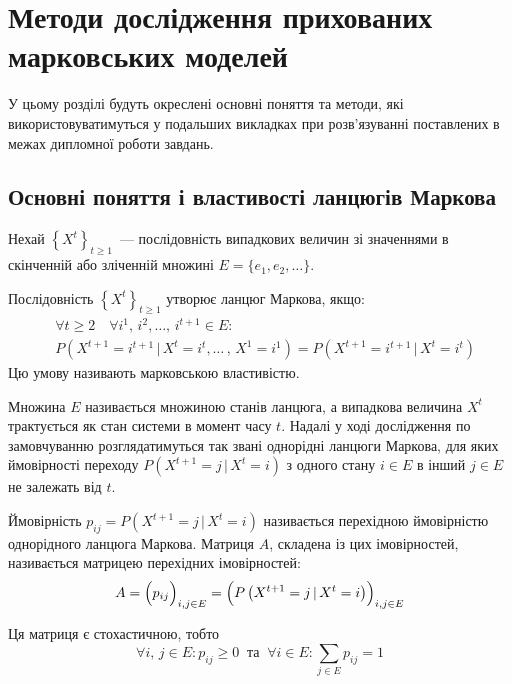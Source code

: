 
\chapter{Методи дослідження прихованих марковських моделей}
\label{chap: review}

У цьому розділі будуть окреслені основні поняття та методи, які використовуватимуться у подальших викладках при розв'язуванні поставлених в межах дипломної роботи завдань.

\section{Основні поняття і властивості ланцюгів Маркова}

Нехай $\left\{ X^t \right\}_{t\geqslant 1}$~--- послідовність випадкових величин зі значеннями в скінченній або зліченній множині $E=\{ e_1,e_2,\ldots \}$. 

\begin{definition}\label{def: markovian property}
    Послідовність $\left\{ X^t \right\}_{t\geqslant 1}$ утворює ланцюг Маркова, якщо:
    \begin{align*}
        & \forall t\geqslant 2 \quad \forall i^1,\,i^2,\ldots,\,i^{t+1} \in E: \\
	    & P\left( X^{t+1}=i^{t+1} \, |\, X^t=i^t,\ldots\,,\, X^1=i^1 \right)=P\left( X^{t+1}=i^{t+1} \, |\, X^t=i^t \right)
    \end{align*}
    Цю умову називають марковською властивістю.
\end{definition}

Множина $E$ називається множиною станів ланцюга, а випадкова величина $X^t$ трактується як стан системи в момент часу $t$. Надалі у ході дослідження по замовчуванню розглядатимуться так звані однорідні ланцюги Маркова, для яких ймовірності переходу $P\left( X^{t+1}=j\,|\,X^{t}=i \right)$ з одного стану $i \in E$ в інший $j \in E$ не залежать від $t$.

Ймовірність $p_{ij} = P\left( X^{t+1}=j\,|\,X^{t}=i \right)$ називається перехідною ймовірністю однорідного ланцюга Маркова. Матриця $A$, складена із цих імовірностей, називається матрицею перехідних імовірностей:
\begin{equation*}
    A = \Bigl( p_{ij} \Bigr)_{i,j \in E} = \Bigl( P\left( X^{t+1}=j\,|\,X^{t}=i \right) \Bigr)_{i,j \in E}
\end{equation*} 

Ця матриця є стохастичною, тобто
\begin{equation*}
    \forall i,\,j \in E: p_{ij} \geqslant 0\ \text{ та }\ \forall i \in E: \sum\limits_{j \in E} p_{ij} = 1
\end{equation*}

